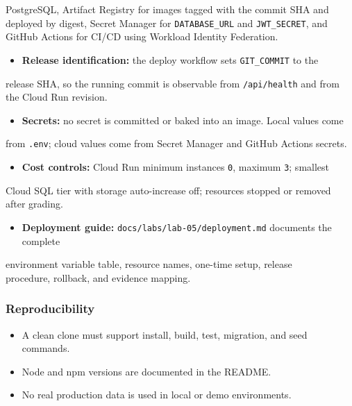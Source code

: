 \documentclass[11pt,a4paper]{article}
\begin{document}
PostgreSQL, Artifact Registry for images tagged with the commit SHA and\\
deployed by digest, Secret Manager for \texttt{DATABASE\_URL} and \texttt{JWT\_SECRET}, and\\
GitHub Actions for CI/CD using Workload Identity Federation.\\
\begin{itemize}[leftmargin=*,itemsep=2pt,topsep=2pt]
  \item \textbf{Release identification:} the deploy workflow sets \texttt{GIT\_COMMIT} to the
\end{itemize}
release SHA, so the running commit is observable from \texttt{/api/health} and from\\
the Cloud Run revision.\\
\begin{itemize}[leftmargin=*,itemsep=2pt,topsep=2pt]
  \item \textbf{Secrets:} no secret is committed or baked into an image. Local values come
\end{itemize}
from \texttt{.env}; cloud values come from Secret Manager and GitHub Actions secrets.\\
\begin{itemize}[leftmargin=*,itemsep=2pt,topsep=2pt]
  \item \textbf{Cost controls:} Cloud Run minimum instances \texttt{0}, maximum \texttt{3}; smallest
\end{itemize}
Cloud SQL tier with storage auto-increase off; resources stopped or removed\\
after grading.\\
\begin{itemize}[leftmargin=*,itemsep=2pt,topsep=2pt]
  \item \textbf{Deployment guide:} \texttt{docs/labs/lab-05/deployment.md} documents the complete
\end{itemize}
environment variable table, resource names, one-time setup, release\\
procedure, rollback, and evidence mapping.\\

\subsubsection{Reproducibility}

\begin{itemize}[leftmargin=*,itemsep=2pt,topsep=2pt]
  \item A clean clone must support install, build, test, migration, and seed commands.
  \item Node and npm versions are documented in the README.
  \item No real production data is used in local or demo environments.
\end{itemize}
\end{document}
